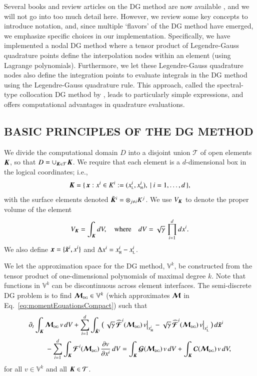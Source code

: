 \documentclass[11pt,letterpaper,twoside,english,final]{article}
\newcommand{\dx}{\Delta x}
\newcommand{\sumx}{\sum_{i=1}^{d}}
\begin{document}
Several books and review articles on the DG method are now available \citep[see, e.g.,][and references therein]{cockburnShu_2001,hesthavenWarburton_2008,shu_2016}, and we will not go into too much detail here.  
However, we review some key concepts to introduce notation, and, since multiple `flavors' of the DG method have emerged, we emphasize specific choices in our implementation.  
Specifically, we have implemented a nodal DG method where a tensor product of Legendre-Gauss quadrature points define the interpolation nodes within an element (using Lagrange polynomials).  
Furthermore, we let these Legendre-Gauss quadrature nodes also define the integration points to evaluate integrals in the DG method using the Legendre-Gauss quadrature rule.  
This approach, called the spectral-type collocation DG method by \citet{bassi_etal_2013}, leads to particularly simple expressions, and offers computational advantages in quadrature evaluations.  

\subsection{BASIC PRINCIPLES OF THE DG METHOD}

We divide the computational domain $D$ into a disjoint union $\mathcal{T}$ of open elements $\boldsymbol{K}$, so that $D = \cup_{\boldsymbol{K} \in \mathcal{T}}\boldsymbol{K}$.  
We require that each element is a $d$-dimensional box in the logical coordinates; i.e.,
\begin{equation}
  \boldsymbol{K}=\{\,\boldsymbol{x} : x^{i} \in K^{i} := (x_{\mbox{\tiny L}}^{i},x_{\mbox{\tiny H}}^{i}),~|~i=1,\ldots,d\,\}, 
\end{equation}
with the surface elements denoted $\tilde{\boldsymbol{K}}^{i}=\otimes_{j\ne i}K^{j}$.  
We use $V_{\boldsymbol{K}}$ to denote the proper volume of the element
\begin{equation}
  V_{\boldsymbol{K}} = \int_{\boldsymbol{K}}dV, \quad\text{where}\quad dV = \sqrt{\gamma}\,\prod_{i=1}^{d}dx^{i}.  
\end{equation}
We also define $\boldsymbol{x}=\{\tilde{\boldsymbol{x}}^{i},x^{i}\}$ and $\dx^{i}=\xH^{i}-\xL^{i}$.  

We let the approximation space for the DG method, $\mathbb{V}^{k}$, be constructed from the tensor product of one-dimensional polynomials of maximal degree $k$.  
Note that functions in $\mathbb{V}^{k}$ can be discontinuous across element interfaces.  
The semi-discrete DG problem is to find $\boldsymbol{\mathcal{M}}_{\mbox{\tiny DG}}\in\mathbb{V}^{k}$ (which approximates $\boldsymbol{\mathcal{M}}$ in Eq.~\eqref{eq:momentEquationsCompact}) such that \citep[cf.][]{cockburnShu_2001}
\begin{align}
  &\partial_{t}\int_{\bK}\bcM_{\DG}\,v\,dV
  +\sumx\int_{\tilde{\bK}^{i}}
  \big(\,
    \sqrt{\gamma}\,\widehat{\bcF}^{i}(\bcM_{\DG})\,v\big|_{\xH^{i}}
    -\sqrt{\gamma}\,\widehat{\bcF}^{i}(\bcM_{\DG})\,v\big|_{\xL^{i}}\,\big)\,d\tilde{\bx}^{i} \nonumber \\
  &\hspace{24pt}
  -\sumx\int_{\bK}\bcF^{i}(\bcM_{\DG})\,\pderiv{v}{x^{i}}\,dV
  =\int_{\bK}\bcG(\bcM_{\DG})\,v\,dV+\int_{\bK}\bcC(\bcM_{\DG})\,v\,dV,
  \label{eq:semidiscreteDG}
\end{align}
for all $v\in\mathbb{V}^{k}$ and all $\boldsymbol{K}\in\mathcal{T}$.  
\end{document}
